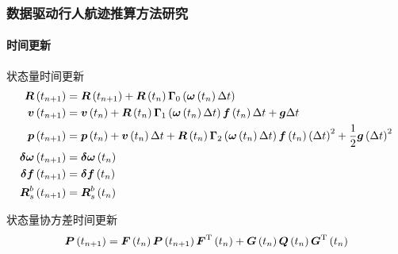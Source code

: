 \begin{frame}

	\frametitle{数据驱动行人航迹推算方法研究}	
	\framesubtitle{时间更新}
	\vspace{-0.2cm}
	{\small
		状态量时间更新
		\begin{align*}
			\vb*{R}\left(t_{n+1}\right) &= \vb*{R}\left(t_{n+1}\right) + \vb*{R}\left(t_{n}\right) \vb*{\Gamma}_{0}\left( \vb*{\omega}\left(t_{n}\right) \Delta t \right) \\
			\vb*{v}\left(t_{n+1}\right) &= \vb*{v}\left(t_{n}\right) 
			+ \vb*{R}\left(t_{n}\right) \vb*{\Gamma}_{1}\left( \vb*{\omega}\left(t_{n}\right) \Delta t \right) \vb*{f}\left(t_{n}\right) \Delta t 
			+ \vb*{g}\Delta t \\
			\vb*{p}\left(t_{n+1}\right) &= \vb*{p}\left(t_{n}\right) 
			+ \vb*{v}\left(t_{n}\right) \Delta t
			+ \vb*{R}\left(t_{n}\right) \vb*{\Gamma}_{2}\left( \vb*{\omega}\left(t_{n}\right) \Delta t \right) \vb*{f}\left(t_{n}\right) \left(\Delta t\right)^2 
			+ \frac{1}{2}\vb*{g}\left(\Delta t\right)^2 \\
			\vb*{\delta \omega}\left(t_{n+1}\right) &= \vb*{\delta \omega}\left(t_{n}\right) \\
			\vb*{\delta f}\left(t_{n+1}\right) &= \vb*{\delta f}\left(t_{n}\right) \\
			\vb*{R}_s^b\left(t_{n+1}\right) &= \vb*{R}_s^b\left(t_{n}\right) 
		\end{align*}
		
		状态量协方差时间更新
		\begin{equation*}
			\vb*{P}\left(t_{n+1}\right) = \vb*{F}\left(t_{n}\right) \vb*{P}\left(t_{n+1}\right) \vb*{F}^{\mathrm{T}}\left(t_{n}\right)
			+ \vb*{G}\left(t_{n}\right) \vb*{Q}\left(t_{n}\right) \vb*{G}^{\mathrm{T}}\left(t_{n}\right)
		\end{equation*}
	}
 
\end{frame}

